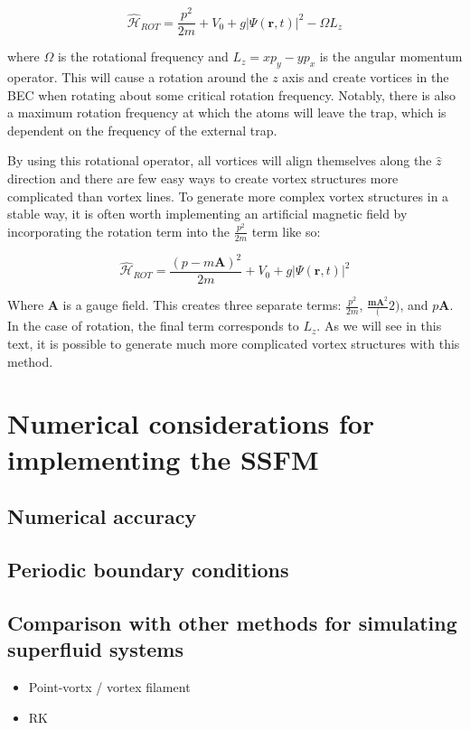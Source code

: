 $$
\mathcal{\hat H}_{ROT} = \frac{p^2}{2m} + V_0 + g|\Psi(\mathbf{r},t)|^2 - \Omega L_z
$$

where $\Omega$ is the rotational frequency and $L_z = xp_y - yp_x$ is the angular momentum operator.
This will cause a rotation around the $z$ axis and create vortices in the BEC when rotating about some critical rotation frequency.
Notably, there is also a maximum rotation frequency at which the atoms will leave the trap, which is dependent on the frequency of the external trap.

By using this rotational operator, all vortices will align themselves along the $\hat z$ direction and there are few easy ways to create vortex structures more complicated than vortex lines.
To generate more complex vortex structures in a stable way, it is often worth implementing an artificial magnetic field by incorporating the rotation term into the $\frac{p^2}{2m}$ term like so:

$$
\mathcal{\hat H}_{ROT} = \frac{(p-m\mathbf{A})^2}{2m} + V_0 + g|\Psi(\mathbf{r},t)|^2
$$

Where $\mathbf{A}$ is a gauge field.
This creates three separate terms: $\frac{p^2}{2m}$, $\frac{\mathbf{mA}^2}(2)$, and $p\mathbf{A}$.
In the case of rotation, the final term corresponds to $L_z$.
As we will see in this text, it is possible to generate much more complicated vortex structures with this method.

\section{Numerical considerations for implementing the SSFM}

\subsection{Numerical accuracy}

\subsection{Periodic boundary conditions}

\subsection{Comparison with other methods for simulating superfluid systems}
\begin{itemize}
\item Point-vortx / vortex filament
\item RK
\end{itemize}
